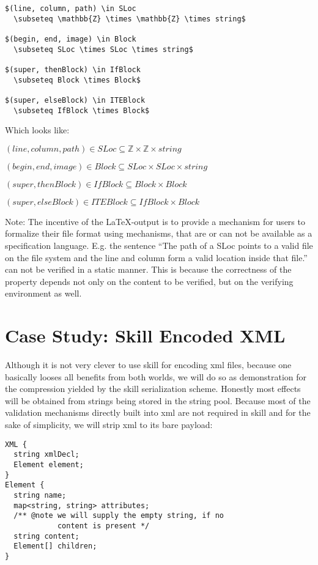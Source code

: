 \documentclass[a4paper,10pt]{article}
\begin{document}
\begin{lstlisting}[label=latexExample,caption=LaTeX Examples,language={[LaTeX]TeX}]
$(line, column, path) \in SLoc
  \subseteq \mathbb{Z} \times \mathbb{Z} \times string$

$(begin, end, image) \in Block
  \subseteq SLoc \times SLoc \times string$

$(super, thenBlock) \in IfBlock
  \subseteq Block \times Block$

$(super, elseBlock) \in ITEBlock
  \subseteq IfBlock \times Block$
\end{lstlisting}
Which looks like:

$(line, column, path) \in SLoc \subseteq \mathbb{Z} \times \mathbb{Z} \times string$

$(begin, end, image) \in Block \subseteq SLoc \times SLoc \times string$

$(super, thenBlock) \in IfBlock \subseteq Block \times Block$

$(super, elseBlock) \in ITEBlock \subseteq IfBlock \times Block$

Note: The incentive of the \LaTeX-output is to provide a mechanism for users to formalize their file format using mechanisms, that are or can not be available as a specification language. E.g. the sentence ``The path of a SLoc points to a valid file on the file system and the line and column form a valid location inside that file.'' can not be verified in a static manner. This is because the correctness of the property depends not only on the content to be verified, but on the verifying environment as well.

\section{Case Study: Skill Encoded XML}
Although it is not very clever to use skill for encoding xml files, because one basically looses all benefits from both worlds, we will do so as demonstration for the compression yielded by the skill serialization scheme. Honestly most effects will be obtained from strings being stored in the string pool. Because most of the validation mechanisms directly built into xml are not required in skill and for the sake of simplicity, we will strip xml to its bare payload:
\begin{lstlisting}[label=sex,caption=Skill Encoded XML]
XML {
  string xmlDecl;
  Element element;
}
Element {
  string name;
  map<string, string> attributes;
  /** @note we will supply the empty string, if no
            content is present */
  string content;
  Element[] children;
}
\end{lstlisting}
\end{document}
